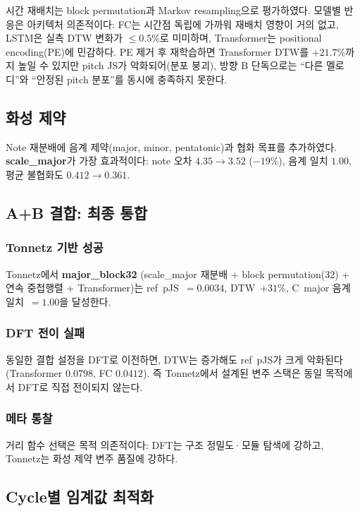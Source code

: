 \documentclass[conference,10pt,a4paper]{IEEEtran}
\begin{document}
시간 재배치는 block permutation과 Markov resampling으로 평가하였다.
모델별 반응은 아키텍처 의존적이다:
FC는 시간점 독립에 가까워 재배치 영향이 거의 없고,
LSTM은 실측 DTW 변화가 $\le 0.5\%$로 미미하며,
Transformer는 positional encoding(PE)에 민감하다.
PE 제거 후 재학습하면 Transformer DTW를 $+21.7\%$까지 높일 수 있지만
pitch JS가 악화되어(분포 붕괴), 방향 B 단독으로는
``다른 멜로디''와 ``안정된 pitch 분포''를 동시에 충족하지 못한다.

\subsection{화성 제약}
\label{subsec:harmony}

Note 재분배에 음계 제약(major, minor, pentatonic)과 협화 목표를
추가하였다. \textbf{scale\_major}가 가장 효과적이다:
note 오차 $4.35 \to 3.52$ ($-19\%$), 음계 일치 $1.00$,
평균 불협화도 $0.412 \to 0.361$.

\subsection{A+B 결합: 최종 통합}
\label{subsec:combined}

\subsubsection{Tonnetz 기반 성공}
Tonnetz에서 \textbf{major\_block32}
(scale\_major 재분배 + block permutation(32) +
연속 중첩행렬 + Transformer)는
ref~pJS~$=0.0034$, DTW~$+31\%$, C~major 음계 일치~$=1.00$을 달성한다.

\subsubsection{DFT 전이 실패}
동일한 결합 설정을 DFT로 이전하면, DTW는 증가해도
ref~pJS가 크게 악화된다(Transformer $0.0798$, FC $0.0412$).
즉 Tonnetz에서 설계된 변주 스택은 동일 목적에서 DFT로 직접 전이되지 않는다.

\subsubsection{메타 통찰}
거리 함수 선택은 목적 의존적이다:
DFT는 구조 정밀도·모듈 탐색에 강하고,
Tonnetz는 화성 제약 변주 품질에 강하다.

\subsection{Cycle별 임계값 최적화}
\label{subsec:percycle}
\end{document}
